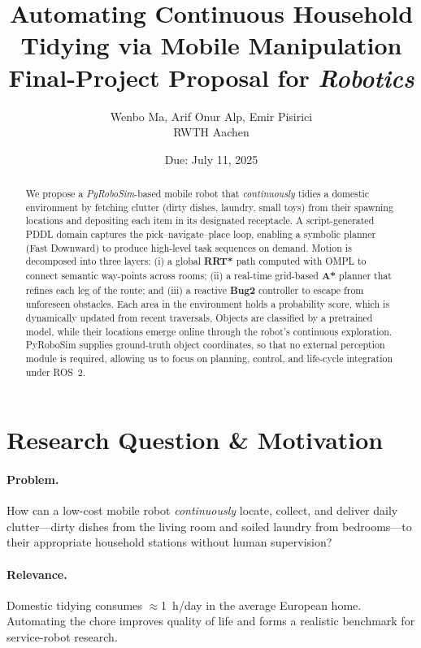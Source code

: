 \documentclass[11pt]{article}
\title{Automating Continuous Household Tidying via Mobile Manipulation\\[2pt]
\large Final-Project Proposal for {\it Robotics}}
\author{Wenbo Ma, Arif Onur Alp, Emir Pisirici\\
RWTH Aachen}
\date{Due: July 11, 2025}
\begin{document}
\maketitle

\begin{abstract}
We propose a \textit{PyRoboSim}-based mobile robot that \emph{continuously} tidies a domestic environment by fetching clutter (dirty dishes, laundry, small toys) from their spawning locations and depositing each item in its designated receptacle.  A script-generated PDDL domain captures the pick--navigate--place loop, enabling a symbolic planner (Fast Downward) to produce high-level task sequences on demand.  Motion is decomposed into three layers: (i) a global \textbf{RRT*} path computed with OMPL to connect semantic way-points across rooms; (ii) a real-time grid-based \textbf{A*} planner that refines each leg of the route; and (iii) a reactive \textbf{Bug2} controller to escape from unforeseen obstacles. Each area in the environment holds a probability score, which is dynamically updated from recent traversals, Objects are classified by a pretrained model, while their locations emerge online through the robot's continuous exploration. PyRoboSim supplies ground-truth object coordinates, so that no external perception module is required, allowing us to focus on planning, control, and life-cycle integration under ROS~2.
\end{abstract}

\section{Research Question \& Motivation}

\paragraph{Problem.}
How can a low-cost mobile robot \emph{continuously} locate, collect, and deliver daily clutter---dirty dishes from the living room and soiled laundry from bedrooms---to their appropriate household stations without human supervision?

\paragraph{Relevance.}
Domestic tidying consumes $\approx$1~h/day in the average European home.  Automating the chore improves quality of life and forms a realistic benchmark for service-robot research.
\end{document}
